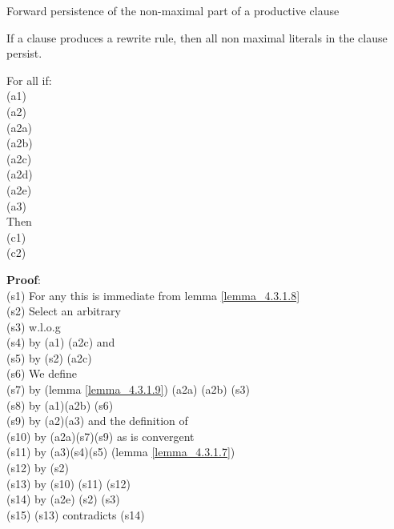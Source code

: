 \begin{lemma}{Forward persistence of the non-maximal part of a productive clause}
\label{lemma_4.3.1.12}

\noindent
If a clause produces a rewrite rule, then all non maximal literals in the clause persist.

\noindent
For all  if:\\
(a1) \\
(a2) \\
\indent (a2a) \\
\indent (a2b) \\
\indent (a2c) \\
\indent (a2d) \\
\indent (a2e) \\
(a3) \\
Then\\
(c1) \\
(c2) 

\bigskip

\noindent
\textbf{Proof}:\\
(s1) For any  this is immediate from lemma \ref{lemma_4.3.1.8}\\
(s2) Select an arbitrary  \\
(s3) w.l.o.g \\
(s4)  by (a1) (a2c) and \\
(s5)  by (s2) (a2c)\\
(s6) We define \\
(s7)  by (lemma \ref{lemma_4.3.1.9}) (a2a) (a2b) (s3)\\
(s8)  by (a1)(a2b) (s6)\\
(s9)  by (a2)(a3) and the definition of \\
(s10)  by (a2a)(s7)(s9) as  is convergent\\
(s11)  by (a3)(s4)(s5) (lemma \ref{lemma_4.3.1.7})\\
(s12)  by (s2)\\
(s13)  by (s10) (s11) (s12)\\
(s14)  by (a2e) (s2) (s3)\\
(s15) (s13) contradicts (s14)


\end{lemma}
